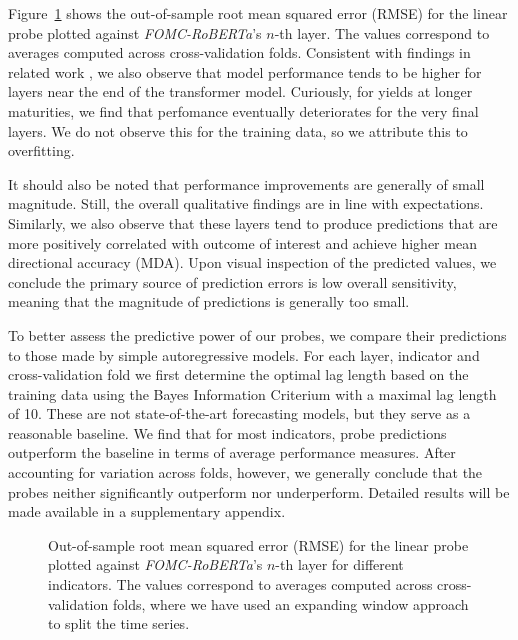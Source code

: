 \documentclass{article}
\theoremstyle{plain}
\theoremstyle{definition}
\theoremstyle{remark}
\begin{document}
Figure~\ref{fig-fomc} shows the out-of-sample root mean squared error (RMSE) for the linear probe plotted against \emph{FOMC-RoBERTa}'s \(n\)-th layer. The values correspond to averages computed across cross-validation folds. Consistent with findings in related work \citep{alain2018understanding,gurnee2023languagev2}, we also observe that model performance tends to be higher for layers near the end of the transformer model. Curiously, for yields at longer maturities, we find that perfomance eventually deteriorates for the very final layers. We do not observe this for the training data, so we attribute this to overfitting. 


It should also be noted that performance improvements are generally of small magnitude. Still, the overall qualitative findings are in line with expectations. Similarly, we also observe that these layers tend to produce predictions that are more positively correlated with outcome of interest and achieve higher mean directional accuracy (MDA). Upon visual inspection of the predicted values, we conclude the primary source of prediction errors is low overall sensitivity, meaning that the magnitude of predictions is generally too small. 

To better assess the predictive power of our probes, we compare their predictions to those made by simple autoregressive models. For each layer, indicator and cross-validation fold we first determine the optimal lag length based on the training data using the Bayes Information Criterium with a maximal lag length of 10. These are not state-of-the-art forecasting models, but they serve as a reasonable baseline. We find that for most indicators, probe predictions outperform the baseline in terms of average performance measures. After accounting for variation across folds, however, we generally conclude that the probes neither significantly outperform nor underperform. Detailed results will be made available in a supplementary appendix.


\begin{figure}


\caption{\label{fig-fomc}Out-of-sample root mean squared error (RMSE) for the linear probe plotted against \emph{FOMC-RoBERTa}'s \(n\)-th layer for different indicators. The values correspond to averages computed across cross-validation folds, where we have used an expanding window approach to split the time series.}

\end{figure}%
\end{document}
